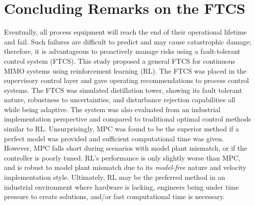 \section{Concluding Remarks on the FTCS}
Eventually, all process equipment will reach the end of their operational lifetime and fail.  Such failures are difficult to predict and may cause catastrophic damage; therefore, it is advantageous to proactively manage risks using a fault-tolerant control system (FTCS).  This study proposed a general FTCS for continuous MIMO systems using reinforcement learning (RL). The FTCS was placed in the supervisory control layer and gave operating recommendations to process control systems. The FTCS was simulated distillation tower, showing its fault tolerant nature, robustness to uncertainties, and disturbance rejection capabilities all while being adaptive. The system was also evaluated from an industrial implementation perspective and compared to traditional optimal control methods similar to RL.  Unsurprisingly, MPC was found to be the superior method if a perfect model was provided and sufficient computational time was given. However, MPC falls short during scenarios with model plant mismatch, or if the controller is poorly tuned. RL's performance is only slightly worse than MPC, and is robust to model plant mismatch due to its \textit{model-free} nature and velocity implementation style. Ultimately, RL may be the preferred method in an industrial environment where hardware is lacking, engineers being under time pressure to create solutions, and/or fast computational time is necessary.
